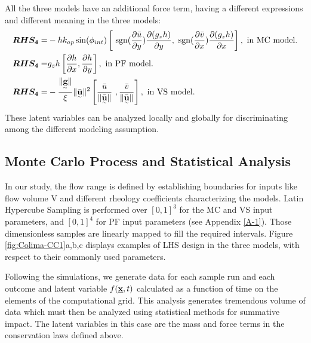 \documentclass{article}
\begin{document}
All the three models have an additional force term, having a different expressions and different meaning in the three models:
\begin{align}
\boldsymbol{RHS_4} =&  - h k_{ap}\sin(\phi_{int})\left[ \ {\rm sgn}(\frac{\partial \bar{u}}{\partial y}) \frac{\partial (g_z h)}{\partial y},\ {\rm sgn}({\frac{\partial \bar{v}}{\partial x}}) \frac{\partial (g_z h)}{\partial x}\right],\textmd{ in MC model.}\nonumber\\
\boldsymbol{RHS_4} =& g_{z}h\left[\frac{\partial h}{\partial x}, \frac{\partial h}{\partial y}\right],\textmd{ in PF model.}\\
\boldsymbol{RHS_4} =& -\frac{\| \underset{^\sim}{\textbf g} \|}{\xi}\| \underset{^\sim}{\bar{\textbf u}} \|^2\left[\frac{\bar{u}}{\| \underset{^\sim}{\bar{\textbf u}}\|} \ ,\frac{\bar{v}}{\| \underset{^\sim}{\bar{\textbf u}}\|}\right],\textmd{ in VS model.}\nonumber
\end{align}
These latent variables can be analyzed locally and globally for discriminating among the different modeling assumption.

\subsection{Monte Carlo Process and Statistical Analysis}
In our study, the flow range is defined by establishing boundaries for inputs like flow volume V and different rheology coefficients characterizing the models.  Latin Hypercube Sampling is performed over $[0,1]^3$ for the MC and VS input parameters, and $[0,1]^4$ for PF input parameters (see Appendix \ref{A-1}). Those dimensionless samples are linearly  mapped to fill the required intervals. Figure \ref{fig:Colima-CC1}a,b,c displays examples of LHS design in the three models, with respect to their commonly used parameters.

Following the simulations, we generate data for each sample run and each outcome and latent variable $f(\underline{\textbf x},t)$ calculated as a function of time on the elements of the computational grid. This analysis generates tremendous volume of data which must then be analyzed using statistical methods for summative impact. The latent variables in this case are the mass and force terms in the conservation laws defined above.
\end{document}
